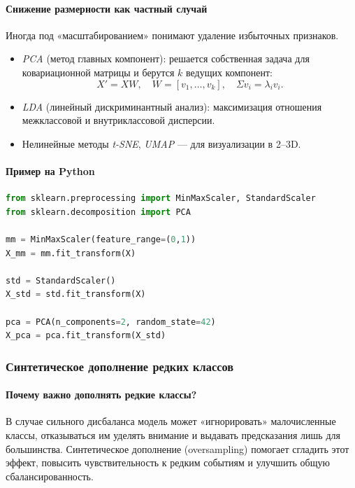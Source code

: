 \paragraph{Снижение размерности как частный случай}  
Иногда под «масштабированием» понимают удаление избыточных признаков.  
\begin{itemize}
  \item \emph{PCA} (метод главных компонент): решается собственная задача для ковариационной матрицы и берутся \(k\) ведущих компонент:
    \[
      X' = XW,\quad W = [v_1,\dots,v_k],\quad \Sigma v_i = \lambda_i v_i.
    \]
  \item \emph{LDA} (линейный дискриминантный анализ): максимизация отношения межклассовой и внутриклассовой дисперсии.
  \item Нелинейные методы \emph{t-SNE}, \emph{UMAP} — для визуализации в 2–3D.
\end{itemize}

\paragraph{Пример на Python}
\begin{lstlisting}[language=Python]
from sklearn.preprocessing import MinMaxScaler, StandardScaler
from sklearn.decomposition import PCA

mm = MinMaxScaler(feature_range=(0,1))
X_mm = mm.fit_transform(X)

std = StandardScaler()
X_std = std.fit_transform(X)

pca = PCA(n_components=2, random_state=42)
X_pca = pca.fit_transform(X_std)
\end{lstlisting}

\subsubsection{Синтетическое дополнение редких классов}
\label{sec:oversampling}

\paragraph{Почему важно дополнять редкие классы?}  
В случае сильного дисбаланса модель может «игнорировать» малочисленные классы, отказываться им уделять внимание и выдавать предсказания лишь для большинства. Синтетическое дополнение (oversampling) помогает сгладить этот эффект, повысить чувствительность к редким событиям и улучшить общую сбалансированность.

